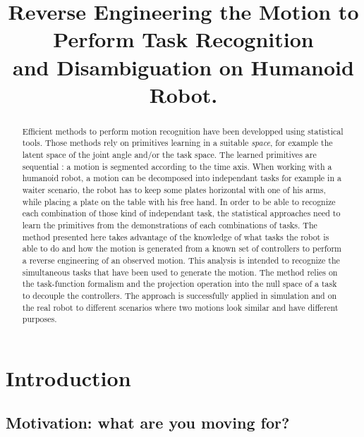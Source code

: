 \documentclass[letterpaper, 10pt, conference]{ieeeconf}      %
\title{\LARGE \bf
Reverse Engineering the Motion to Perform Task Recognition\\ and Disambiguation on Humanoid Robot.
}
\begin{document}
\maketitle
\thispagestyle{empty}
\pagestyle{empty}


\begin{abstract}
Efficient methods to perform motion recognition have been developped
using statistical tools. Those methods rely on primitives learning
in a suitable \emph{space}, for example the latent space of the joint angle and/or the task space.
The learned primitives are sequential : a motion is segmented according to the time axis.
When working with a humanoid robot, a motion can be decomposed into
independant tasks for example in a waiter scenario,
the robot has to keep some plates horizontal with one of his arms, while placing a plate
on the table with his free hand.
In order to be able to recognize each combination of those kind of independant task,
the statistical approaches need to learn the primitives from the demonstrations of each
combinations of tasks.
The method presented here
takes advantage of the knowledge of what tasks the robot is able to do and how
the motion is generated from a known set of controllers to perform a reverse engineering of an
observed motion. This analysis is intended to recognize the simultaneous tasks that
have been used to generate the motion. The method relies
on the task-function formalism and the projection operation into the null space of a task to decouple
the controllers.
The approach is successfully applied in simulation and on the real robot
to different scenarios where two motions look similar and have
different purposes.
\end{abstract}

\section{Introduction}
\subsection{Motivation: what are you moving for?}
\end{document}
